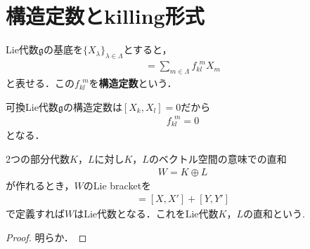 \section{構造定数とkilling形式}
\begin{defn}
	Lie代数\(\mathfrak{g}\)の基底を\(\{X_{\lambda}\}_{\lambda\in\Lambda}\)とすると，
	\begin{align}
		[X_{k},X_{l}]=\sum_{m\in{}\Lambda}f_{kl}^{\ \ m}X_{m}
	\end{align}
	と表せる．この\(f_{kl}^{\ \ m}\)を\textbf{構造定数}という．
\end{defn}
\begin{eg}
	可換Lie代数\(\mathfrak{g}\)の構造定数は\([X_{k},X_{l}]=0\)だから
	\begin{align}
		f_{kl}^{\ \ m}=0
	\end{align}
	となる．
\end{eg}
\begin{prop}[Lie代数の直和]
	2つの部分代数\(K\)，\(L\)に対し\(K\)，\(L\)のベクトル空間の意味での直和
	\begin{align}
		W=K\oplus{}L
	\end{align}
	が作れるとき，\(W\)のLie bracketを
	\begin{align}
		[(X+Y),(X'+Y')]=[X,X']+[Y,Y']
	\end{align}
	で定義すれば\(W\)はLie代数となる．これをLie代数\(K\)，\(L\)の直和という.
\end{prop}
\begin{proof}
	明らか．
\end{proof}
